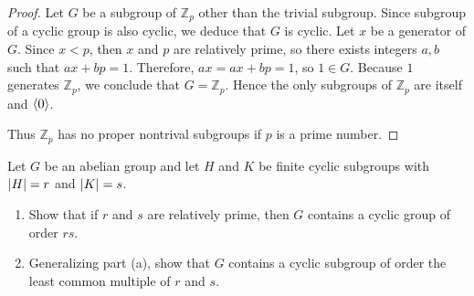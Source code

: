 \begin{proof}
    Let $G$ be a subgroup of $\mathbb{Z}_{p}$ other than the trivial subgroup. Since subgroup of a cyclic group is also cyclic, we deduce that $G$ is cyclic. Let $x$ be a generator of $G$. Since $x < p$, then $x$ and $p$ are relatively prime, so there exists integers $a, b$ such that $ax + bp = 1$. Therefore, $ax = ax + bp = 1$, so $1\in G$. Because $1$ generates $\mathbb{Z}_{p}$, we conclude that $G = \mathbb{Z}_{p}$. Hence the only subgroups of $\mathbb{Z}_{p}$ are itself and $\left\langle{0}\right\rangle$.

    Thus $\mathbb{Z}_{p}$ has no proper nontrival subgroups if $p$ is a prime number.
\end{proof}

\newpage
\begin{exercise}
    Let $G$ be an abelian group and let $H$ and $K$ be finite cyclic subgroups with $\left\vert{H}\right\vert = r$ and $\left\vert{K}\right\vert = s$.
    \begin{enumerate}[label={\textbf{\alph*.}}]
        \item Show that if $r$ and $s$ are relatively prime, then $G$ contains a cyclic group of order $rs$.
        \item Generalizing part (a), show that $G$ contains a cyclic subgroup of order the least common multiple of $r$ and $s$.
    \end{enumerate}
\end{exercise}


